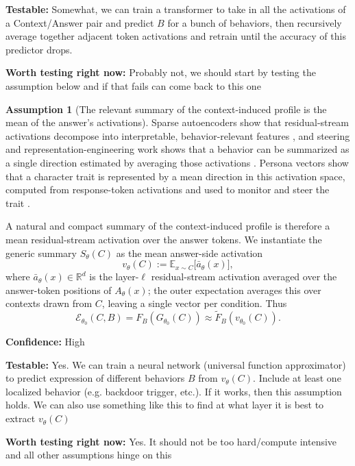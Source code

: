 \documentclass[11pt]{article}
\theoremstyle{definition}
\theoremstyle{definition}
\theoremstyle{assumptionstyle}
\newtheorem{assumption}{Assumption}[section]
\newcommand{\E}{\mathbb{E}}            %
\newcommand{\Expr}{\mathcal{E}}        %
\newcommand{\R}{\mathbb{R}}
\begin{document}
\textbf{Testable:} Somewhat, we can train a transformer to take in all the activations of a Context/Answer pair and predict $B$ for a bunch of behaviors, then recursively average together adjacent token activations and retrain until the accuracy of this predictor drops.

\textbf{Worth testing right now:} Probably not, we should start by testing the assumption below and if that fails can come back to this one
\begin{assumption}[The relevant summary of the context-induced profile is the mean of the answer's activations]
\label{a:activation-summary}
Sparse autoencoders show that residual-stream activations decompose into
interpretable, behavior-relevant features \cite{cunningham2023,templeton2024},
and steering and representation-engineering work shows that a behavior can be
summarized as a single direction estimated by averaging those activations
\cite{turner2023,panickssery2023,zou2023,arditi2024}. Persona vectors show that a character trait is represented by a mean direction in this
activation space, computed from response-token activations and used to monitor
and steer the trait \cite{chen2025}.

A natural and compact summary of the
context-induced profile is therefore a mean residual-stream activation over the answer tokens. We
instantiate the generic summary \(S_\theta(C)\) as the mean answer-side
activation
\[
v_\theta(C)
:=
\E_{x\sim C}
\big[
\bar a_\theta(x)
\big],
\]
where \(\bar a_\theta(x)\in\R^d\) is the layer-\(\ell\) residual-stream activation
averaged over the answer-token positions of \(A_\theta(x)\); the outer expectation
averages this over contexts drawn from \(C\), leaving a single vector per
condition. Thus
\[
\Expr_{\theta_0}(C,B)
=
F_B(G_{\theta_0}(C))
\approx
\widetilde F_B(v_{\theta_0}(C)).
\]

\textbf{Confidence:} High

\textbf{Testable:} Yes. We can train a neural network (universal function approximator) to predict expression of different behaviors $B$ from $v_\theta(C)$. Include at least one localized behavior (e.g. backdoor trigger, etc.). If it works, then this assumption holds. We can also use something like this to find at what layer it is best to extract $v_\theta(C)$

\textbf{Worth testing right now:} Yes. It should not be too hard/compute intensive and all other assumptions hinge on this
\end{assumption}
\end{document}
